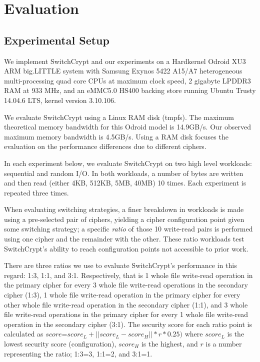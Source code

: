 \section{Evaluation}\label{sec:evaluation}

\subsection{Experimental Setup}

We implement SwitchCrypt and our experiments on a Hardkernel Odroid XU3 ARM
big.LITTLE system with Samsung Exynos 5422 A15/A7 heterogeneous multi-processing
quad core CPUs at maximum clock speed, 2 gigabyte LPDDR3 RAM at 933 MHz, and an
eMMC5.0 HS400 backing store running Ubuntu Trusty 14.04.6 LTS, kernel version
3.10.106.

We evaluate SwitchCrypt using a Linux RAM disk (tmpfs). The maximum theoretical
memory bandwidth for this Odroid model is 14.9GB/s\@. Our observed maximum
memory bandwidth is 4.5GB/s. Using a RAM disk focuses the evaluation on the 
performance differences due to different ciphers.

In each experiment below, we evaluate SwitchCrypt on two high level workloads:
sequential and random I/O. In both workloads, a number of bytes are written and
then read (either 4KB, 512KB, 5MB, 40MB) 10 times. Each experiment is repeated
three times.

When evaluating switching strategies, a finer breakdown in workloads is made
using a pre-selected pair of ciphers, yielding a cipher configuration point
given some switching strategy; a specific \emph{ratio} of those 10 write-read
pairs is performed using one cipher and the remainder with the other. These
ratio workloads test SwitchCrypt's ability to reach configuration points not
accessible to prior work.

There are three ratios we use to evaluate SwitchCrypt's performance in this
regard: 1:3, 1:1, and 3:1. Respectively, that is 1 whole file write-read
operation in the primary cipher for every 3 whole file write-read operations in
the secondary cipher (1:3), 1 whole file write-read operation in the primary
cipher for every other whole file write-read operation in the secondary cipher
(1:1), and 3 whole file write-read operations in the primary cipher for every 1
whole file write-read operation in the secondary cipher (3:1).  The security
score for each ratio point is calculated as $score$=$score_L + ||score_L -
score_H|| * r * 0.25)$ where $score_L$ is the lowest security score
(configuration), $score_H$ is the highest, and $r$ is a number representing the
ratio; 1:3=3, 1:1=2, and 3:1=1.

